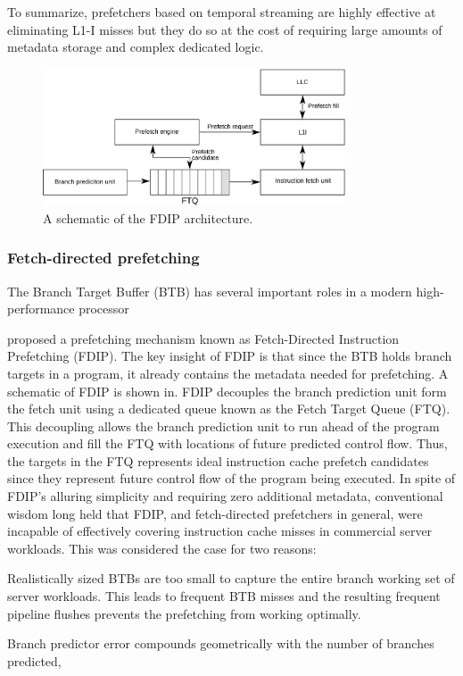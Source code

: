 \documentclass[../main.tex]{subfiles}
\begin{document}
\begin{refsection}
To summarize, prefetchers based on temporal streaming are highly effective at eliminating L1-I misses but they do so at the cost of requiring large amounts of metadata storage and complex dedicated logic.

\begin{figure}[ht]
  \centering
  \includegraphics[width=0.8\textwidth]{figures/fdip1.pdf}
  \caption{\label{fig:fdip} A schematic of the FDIP architecture.}
\end{figure}

\subsubsection{Fetch-directed prefetching}
The Branch Target Buffer (BTB) has several important roles in a modern high-performance processor 

\textcite{reinman99_fetch_direc_instr_prefet} proposed a prefetching
mechanism known as Fetch-Directed Instruction Prefetching (FDIP). The
key insight of FDIP is that since the BTB holds branch targets in a
program, it already contains the metadata needed for prefetching. A
schematic of FDIP is shown in. FDIP decouples the
branch prediction unit form the fetch unit using a dedicated queue
known as the Fetch Target Queue (FTQ). This decoupling allows the
branch prediction unit to run ahead of the program execution and fill
the FTQ with locations of future predicted control flow. Thus, the
targets in the FTQ represents ideal instruction cache prefetch
candidates since they represent future control flow of the program
being executed. In spite of FDIP's alluring simplicity and requiring
zero additional metadata, conventional wisdom long held that FDIP, and
fetch-directed prefetchers in general, were incapable of effectively
covering instruction cache misses in commercial server workloads. This was considered the case for two reasons: \begin{inparaenum}  \item Realistically sized BTBs are too small to capture the entire branch working set of server workloads. This leads to frequent BTB misses and the resulting frequent pipeline flushes prevents the prefetching from working optimally. \item Branch predictor error compounds geometrically with the number of branches predicted, 
\end{inparaenum}



\end{refsection}
\end{document}
